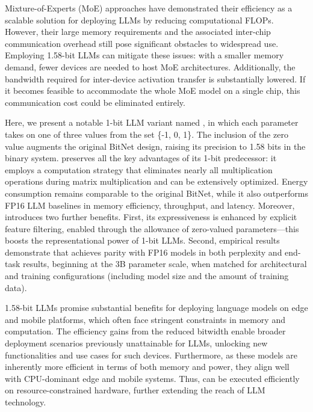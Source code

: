 Mixture-of-Experts (MoE) approaches have demonstrated their efficiency as a scalable solution for deploying LLMs by reducing computational FLOPs. However, their large memory requirements and the associated inter-chip communication overhead still pose significant obstacles to widespread use. Employing 1.58-bit LLMs can mitigate these issues: with a smaller memory demand, fewer devices are needed to host MoE architectures. Additionally, the bandwidth required for inter-device activation transfer is substantially lowered. If it becomes feasible to accommodate the whole MoE model on a single chip, this communication cost could be eliminated entirely.

Here, we present a notable 1-bit LLM variant named \textbf{}, in which each parameter takes on one of three values from the set \{-1, 0, 1\}. The inclusion of the zero value augments the original BitNet design, raising its precision to 1.58 bits in the binary system.  preserves all the key advantages of its 1-bit predecessor: it employs a computation strategy that eliminates nearly all multiplication operations during matrix multiplication and can be extensively optimized. Energy consumption remains comparable to the original BitNet, while it also outperforms FP16 LLM baselines in memory efficiency, throughput, and latency. Moreover,  introduces two further benefits. First, its expressiveness is enhanced by explicit feature filtering, enabled through the allowance of zero-valued parameters—this boosts the representational power of 1-bit LLMs. Second, empirical results demonstrate that  achieves parity with FP16 models in both perplexity and end-task results, beginning at the 3B parameter scale, when matched for architectural and training configurations (including model size and the amount of training data).

1.58-bit LLMs promise substantial benefits for deploying language models on edge and mobile platforms, which often face stringent constraints in memory and computation. The efficiency gains from the reduced bitwidth enable broader deployment scenarios previously unattainable for LLMs, unlocking new functionalities and use cases for such devices. Furthermore, as these models are inherently more efficient in terms of both memory and power, they align well with CPU-dominant edge and mobile systems. Thus,  can be executed efficiently on resource-constrained hardware, further extending the reach of LLM technology.

